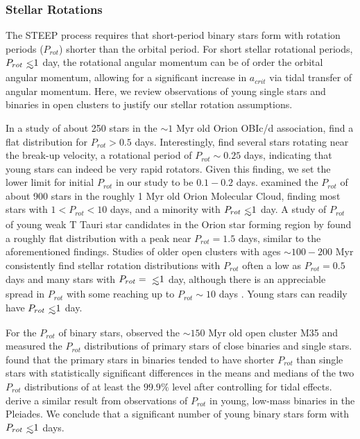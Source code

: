 \subsubsection{Stellar Rotations} \label{sec:stellar_rotations}

The STEEP process requires that short-period binary stars form with rotation periods ($P_{rot}$) shorter than the orbital period.  For short stellar rotational periods, $P_{rot} \lsim 1$ day, the rotational angular momentum can be of order the orbital angular momentum, allowing for a significant increase in $a_{crit}$ via tidal transfer of angular momentum.  Here, we review observations of young single stars and binaries in open clusters to justify our stellar rotation assumptions.

In a study of about 250 stars in the ${\sim}1$ Myr old Orion OBIc/d association, \citet{Stassun1999} find a flat distribution for $P_{rot} > 0.5$ days.  Interestingly, \citet{Stassun1999} find several stars rotating near the break-up velocity, a rotational period of $P_{rot}{\sim} 0.25$ days, indicating that young stars can indeed be very rapid rotators.  Given this finding, we set the lower limit for initial $P_{rot}$ in our study to be $0.1-0.2$ days.  \citet{Rebull2006} examined the $P_{rot}$ of about 900 stars in the roughly 1 Myr old Orion Molecular Cloud, finding most stars with $1 < P_{rot} < 10$ days, and a minority with $P_{rot} \lsim 1$ day.  A study of $P_{rot}$ of young weak T Tauri star candidates in the Orion star forming region by \citet{Marilli2007} found a roughly flat distribution with a peak near $P_{rot} = 1.5$ days, similar to the aforementioned findings.  Studies of older open clusters with ages ${\sim}100-200$ Myr consistently find stellar rotation distributions with $P_{rot}$ often a low as $P_{rot} = 0.5$ days and many stars with $P_{rot} = \lsim 1$ day, although there is an appreciable spread in $P_{rot}$ with some reaching up to $P_{rot} {\sim} 10$ days \citep[see][]{Marilli2007,Meibom2009,Meibom2011}.  Young stars can readily have $P_{rot} \lsim 1$ day.

For the $P_{rot}$ of binary stars, \citet{Meibom2007} observed the ${\sim}150$ Myr old open cluster M35 and measured the $P_{rot}$ distributions of primary stars of close binaries and single stars.  \citet{Meibom2007} found that the primary stars in binaries tended to have shorter $P_{rot}$ than single stars with statistically significant differences in the means and medians of the two $P_{rot}$ distributions of at least the $99.9\%$ level after controlling for tidal effects.  \citet{Stauffer2016} derive a similar result from observations of $P_{rot}$ in young, low-mass binaries in the Pleiades.  We conclude that a significant number of young binary stars form with $P_{rot} \lsim 1$ days. 

